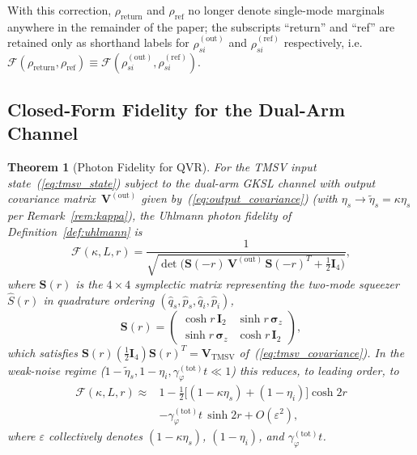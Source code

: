 \documentclass[journal]{IEEEtran}
\newtheorem{theorem}{Theorem}
\begin{document}
With this correction, $\rho_{\text{return}}$ and $\rho_{\text{ref}}$ no longer denote single-mode marginals anywhere in the remainder of the paper; the subscripts ``return'' and ``ref'' are retained only as shorthand labels for $\rho_{si}^{(\text{out})}$ and $\rho_{si}^{(\text{ref})}$ respectively, i.e.\ $\mathcal F(\rho_{\text{return}},\rho_{\text{ref}}) \equiv \mathcal F(\rho_{si}^{(\text{out})},\rho_{si}^{(\text{ref})})$.

\subsection{Closed-Form Fidelity for the Dual-Arm Channel}

\begin{theorem}[Photon Fidelity for QVR]\label{thm:fidelity}
For the TMSV input state~(\ref{eq:tmsv_state}) subject to the dual-arm GKSL channel with output covariance matrix~$\mathbf{V}^{(\text{out})}$ given by~(\ref{eq:output_covariance}) (with $\eta_s\to\tilde\eta_s=\kappa\eta_s$ per Remark~\ref{rem:kappa}), the Uhlmann photon fidelity of Definition~\ref{def:uhlmann} is
\begin{equation}\label{eq:fidelity_closed}
\mathcal{F}(\kappa, L, r) = \frac{1}{\sqrt{\det\!\big(\mathbf{S}(-r)\,\mathbf{V}^{(\text{out})}\,\mathbf{S}(-r)^{T} + \tfrac{1}{2}\mathbf{I}_4\big)}},
\end{equation}
where $\mathbf{S}(r)$ is the $4\times 4$ symplectic matrix representing the two-mode squeezer $\hat S(r)$ in quadrature ordering $(\hat q_s,\hat p_s,\hat q_i,\hat p_i)$,
\begin{equation}
\mathbf{S}(r)=\begin{pmatrix}\cosh r\,\mathbf I_2 & \sinh r\,\boldsymbol\sigma_z \\ \sinh r\,\boldsymbol\sigma_z & \cosh r\,\mathbf I_2\end{pmatrix},
\end{equation}
which satisfies $\mathbf S(r)(\tfrac12\mathbf I_4)\mathbf S(r)^T = \mathbf V_{\text{TMSV}}$ of~(\ref{eq:tmsv_covariance}). In the weak-noise regime ($1-\tilde\eta_s,1-\eta_i,\gamma_\varphi^{(\text{tot})}t\ll1$) this reduces, to leading order, to
\begin{equation}\label{eq:fidelity_asymptotic}
\begin{aligned}
\mathcal{F}(\kappa, L, r) \approx {}& 1 - \tfrac12\big[(1-\kappa\eta_s)+(1-\eta_i)\big]\cosh 2r \\
&- \gamma_\varphi^{(\text{tot})}t\,\sinh 2r + O(\varepsilon^2),
\end{aligned}
\end{equation}
where $\varepsilon$ collectively denotes $(1-\kappa\eta_s)$, $(1-\eta_i)$, and $\gamma_\varphi^{(\text{tot})}t$.
\end{theorem}
\end{document}
